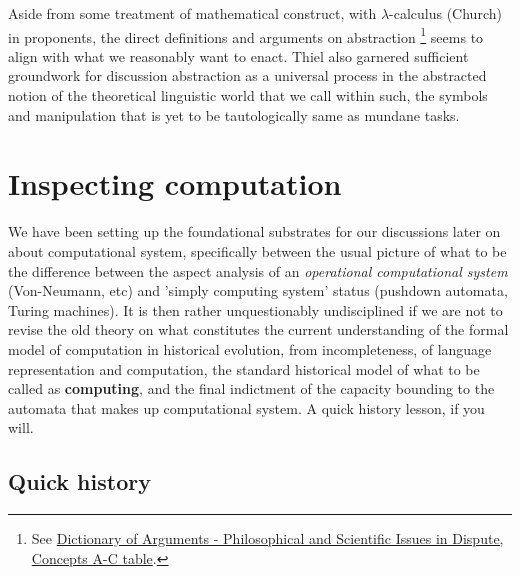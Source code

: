Aside from some treatment of mathematical construct, with $\lambda$-calculus (Church) in proponents, the direct definitions and arguments on abstraction \footnote{See \href{https://philosophy-science-humanities-controversies.com/table-concepts.php}{Dictionary of Arguments - Philosophical and Scientific Issues in Dispute, Concepts A-C table}.} seems to align with what we reasonably want to enact. Thiel also garnered sufficient groundwork for discussion abstraction as a universal process in the abstracted notion of the theoretical linguistic world that we call within such, the symbols and manipulation that is yet to be tautologically same as mundane tasks. 

\section{Inspecting computation}

We have been setting up the foundational substrates for our discussions later on about computational system, specifically between the usual picture of what to be the difference between the aspect analysis of an \textit{operational computational system} (Von-Neumann, etc) and 'simply computing system' status (pushdown automata, Turing machines). It is then rather unquestionably undisciplined if we are not to revise the old theory on what constitutes the current understanding of the formal model of computation in historical evolution, from incompleteness, of language representation and computation, the standard historical model of what to be called as \textbf{computing}, and the final indictment of the capacity bounding to the automata that makes up computational system. A quick history lesson, if you will. 

\subsection{Quick history}

